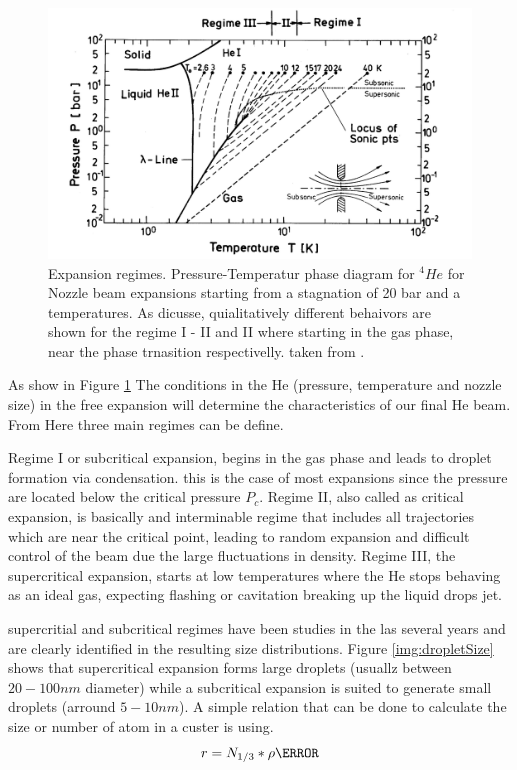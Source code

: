 \begin{figure}[hbtp] \label{fig:ExpRegim}
\centering
\includegraphics[width= 13 cm]{../Images/expansion_regimes.PNG}
\caption[Phase diagram for Expantion regimens]{Expansion regimes. Pressure-Temperatur phase diagram for $^{4}He$ for Nozzle beam expansions starting from a stagnation of 20 bar and a temperatures. As dicusse, quialitatively different behaivors are shown for the regime I - II and II where  starting in the gas phase,  near the phase trnasition respectivelly. taken from \cite{buchenau_mass_1990}. }
\end{figure}

As show in Figure \ref{fig:ExpRegim} The conditions in the He (pressure, temperature and nozzle size) in the free expansion will determine the characteristics of our final He beam. From Here three main regimes can be define.

Regime I or subcritical expansion, begins in the gas phase and leads to droplet formation via condensation. this is the case of most expansions since the pressure are located below the critical pressure $P_{c}$.
Regime II, also called as critical expansion, is basically  and interminable regime that includes all trajectories which are near the critical point, leading to random expansion and difficult control of the beam due the large fluctuations in density.
Regime III, the  supercritical expansion, starts at low temperatures where the He stops behaving as an ideal gas, expecting flashing or cavitation  breaking up the liquid drops jet. \cite{buchenau_mass_1990}

supercritial and subcritical regimes have been studies  in the las several years and  are clearly identified in the resulting size distributions. Figure \ref{img:dropletSize} shows that supercritical expansion forms large droplets (usuallz between $20-100 nm$ diameter) while a subcritical expansion is suited to generate small droplets (arround $5-10 nm$).  A simple relation that can be done to calculate the size or number of atom in a custer is using. \begin{equation}
r=N_{1/3} * \rho\angstrom
\end{equation}


